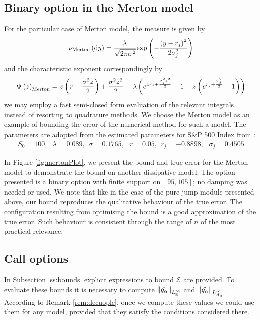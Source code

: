 \documentclass[11pt]{amsart}
\begin{document}
\subsection{Binary option in the Merton model}
For the particular case of Merton model, the \levy measure is given by
\begin{align*}
\nu_{\mathrm{Merton}} \left( {\textrm{d} y} \right)
=
\frac{\lambda}{\sqrt{2 \pi \sigma^2}} \mathrm{exp}\left ( {-\frac{\left( {y-r_j} \right)^2}{2\sigma_j^2}}\right )
\end{align*}
and the characteristic exponent correspondingly by
\begin{align*}
\Psi \left( {{z}} \right)_{\mathrm{Merton}}
=
z \left( {r-\frac{\sigma^2 z}{2}} \right)
+ \frac{\sigma^2 z^2}{2}
+ \lambda
\left( {e^{z r_j + \frac{\sigma_j^2 z^2}{2}}-1 - z \left( {e^{r_j +\frac{\sigma_j^2}{2} }-1} \right) } \right)
\end{align*}
we may employ a fast semi-closed form evaluation
of the relevant integrals instead of resorting to quadrature methods.
We choose the Merton model as an example of bounding the error of the numerical method for such
a model. The parameters are adopted from 
the estimated parameters for S\&P 500 Index from 
\cite{andersen2000jump}:
\begin{align*}
S_0 = 100,
~~~
\lambda = 0.089,
~~
\sigma = 0.1765,
~~~
r = 0.05,
~~
r_j = -0.8898,
~~~
\sigma_j = 0.4505
\end{align*}

In Figure \ref{fig:mertonPlot}, we present the bound and true error for the Merton model
to demonstrate the bound on another dissipative model. The option presented is a binary option
with finite support on $[95,105]$; no damping was needed or used. We note that
like in the case of the pure-jump module presented above, our bound reproduces the
qualitative behaviour of the true error. The configuration resulting from optimising the bound
is a good approximation of the true error. Such behaviour is consistent through the range of
$n$ of the most practical relevance.


\subsection{Call options}
\label{subsec:call}
In Subsection \ref{ss:bounds} explicit expressions to bound $\mathcal{E}$ are provided. 
To evaluate these bounds it is necessary to compute $\left\|\hat{g_{\alpha}}\right\|_{L^\infty_{\mathbb{R}}}$ and $\left\|\hat{g_{\alpha}}\right\|_{L^\infty_{A_{a}}}$. According to Remark \ref{rem:decuople}, once
we compute these values we could use them for any model, provided that 
they satisfy the conditions considered there.
\end{document}
